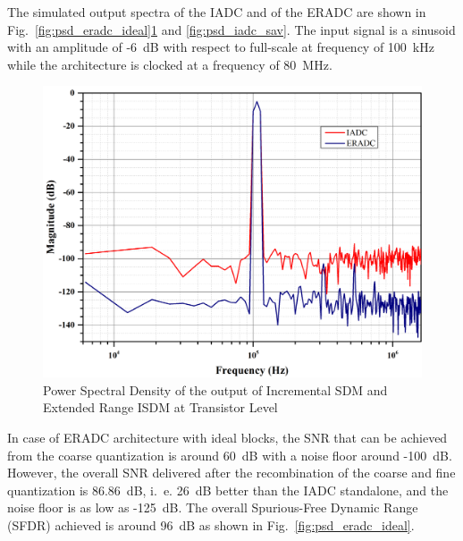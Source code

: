 The simulated output spectra of the IADC and of the ERADC are shown in Fig.~\ref{fig:psd_eradc_ideal}\ref{fig:psd_eradc_sch} and \ref{fig:psd_iadc_sav}. The input signal is a sinusoid with an amplitude of -6~dB with respect to full-scale at frequency of 100~kHz while the architecture is clocked at a frequency of 80~MHz. 
%
\begin{figure}[h!]
    \centering
    \includegraphics[width=0.8\columnwidth]{Chap06/Figures/PSD_sch.jpg}
    \caption{Power Spectral Density of the output of Incremental SDM and Extended Range ISDM at Transistor Level}
    \label{fig:psd_eradc_sch}
\end{figure}
%

In case of ERADC architecture with ideal blocks, the SNR that can be achieved from the coarse quantization is around 60~dB with a noise floor around -100~dB. However, the overall SNR delivered after the recombination of the coarse and fine quantization is 86.86~dB, i.~e. 26~dB better than the IADC standalone, and the noise floor is as low as -125~dB. The overall Spurious-Free Dynamic Range (SFDR) achieved is around 96~dB as shown in Fig.~\ref{fig:psd_eradc_ideal}.

